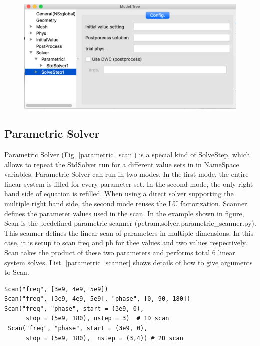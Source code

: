 \documentclass[11pt,a4paper,final]{report}
\begin{document}
\begin{figure}
\centering
\includegraphics[width=0.95\columnwidth]{figures/solve_step.png} 
\caption{  }\label{solve_step}
\end{figure}


\subsection{Parametric Solver}
Parametric Solver (Fig. \ref{parametric_scan}) is a special kind of SolveStep, which allows to repeat the StdSolver run for a different value sets in   in NameSpace variables. 
Parametric Solver can run in two modes. In the first mode, the entire linear system is filled for every parameter set.
In the second mode, the only right hand side of equation is refilled. When using a direct solver supporting the multiple
right hand side, the second mode reuses the LU factorization. 
Scanner defines the parameter values used in the scan.  In the example shown in figure, Scan is the predefined parametric scanner (petram.solver.parametric\_scanner.py). 
This scanner defines the linear scan of parameters in multiple dimensions. 
In this case, it is setup to scan freq and ph for thee values and two values respectively. 
Scan takes the product of these two parameters and performs total 6 linear system solves.
List. \ref{parametric_scanner} shows details of how to give arguments to Scan.

\begin{minipage}[c]{0.95\textwidth}
\begin{lstlisting}[caption={Parametric Scanner},captionpos=b, frame=single, label={parametric_scanner}]
Scan("freq", [3e9, 4e9, 5e9])
Scan("freq", [3e9, 4e9, 5e9], "phase", [0, 90, 180])
Scan("freq", "phase", start = (3e9, 0), 
      stop = (5e9, 180), nstep = 3)  # 1D scan 
 Scan("freq", "phase", start = (3e9, 0), 
      stop = (5e9, 180),  nstep = (3,4)) # 2D scan 
\end{lstlisting}
\end{minipage}
\end{document}
